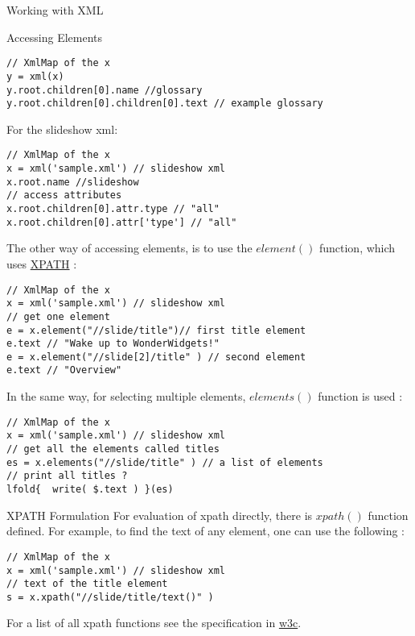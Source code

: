 \begin{section}{Working with XML}
\begin{subsection}{Accessing Elements}
\begin{lstlisting}[style=JexlStyle]
// XmlMap of the x 
y = xml(x)
y.root.children[0].name //glossary
y.root.children[0].children[0].text // example glossary 
\end{lstlisting}

For the slideshow xml: 

\begin{lstlisting}[style=JexlStyle]
// XmlMap of the x 
x = xml('sample.xml') // slideshow xml 
x.root.name //slideshow
// access attributes 
x.root.children[0].attr.type // "all"
x.root.children[0].attr['type'] // "all"
\end{lstlisting}

The other way of accessing elements, 
is to use the $element()$ function, 
which uses \href{https://en.wikipedia.org/wiki/XPath}{XPATH} :
\begin{lstlisting}[style=JexlStyle]
// XmlMap of the x 
x = xml('sample.xml') // slideshow xml 
// get one element  
e = x.element("//slide/title")// first title element 
e.text // "Wake up to WonderWidgets!"
e = x.element("//slide[2]/title" ) // second element 
e.text // "Overview"
\end{lstlisting}

In the same way, for selecting multiple elements, $elements()$
function is used : 

\begin{lstlisting}[style=JexlStyle]
// XmlMap of the x 
x = xml('sample.xml') // slideshow xml 
// get all the elements called titles  
es = x.elements("//slide/title" ) // a list of elements 
// print all titles ?
lfold{  write( $.text ) }(es)
\end{lstlisting}

\end{subsection}

\begin{subsection}{XPATH Formulation}
For evaluation of xpath directly, there is $xpath()$ function 
defined. For example, to find the text of any element, 
one can use the following :

\begin{lstlisting}[style=JexlStyle]
// XmlMap of the x 
x = xml('sample.xml') // slideshow xml
// text of the title element 
s = x.xpath("//slide/title/text()" )  
\end{lstlisting}

For a list of all xpath functions see the specification in 
\href{https://www.w3.org/TR/xpath-functions-3}{w3c}.


\end{subsection}
\end{section}
